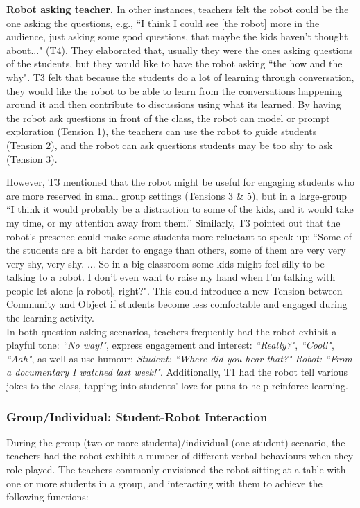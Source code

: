 \textbf{Robot asking teacher.} In other instances, teachers felt the robot could be the one asking the questions, e.g., ``I think I could see [the robot] more in the audience, just asking some good questions, that maybe the kids haven’t thought about..." (T4). They elaborated that, usually they were the ones asking questions of the students, but they would like to have the robot asking ``the how and the why". T3 felt that because the students do a lot of learning through conversation, they would like the robot to be able to learn from the conversations happening around it and then contribute to discussions using what its learned. By having the robot ask questions in front of the class, the robot can model or prompt exploration (Tension 1), the teachers can use the robot to guide students (Tension 2), and the robot can ask questions students may be too shy to ask (Tension 3).

However, T3 mentioned that the robot might be useful for engaging students who are more reserved in small group settings (Tensions 3 \& 5), but in a large-group ``I think it would probably be a distraction to some of the kids, and it would take my time, or my attention away from them.'' Similarly, T3 pointed out that the robot's presence could make some students more reluctant to speak up: ``Some of the students are a bit harder to engage than others, some of them are very very very shy, very shy. ... So in a big classroom some kids might feel silly to be talking to a robot.  I don't even want to raise my hand when I'm talking with people let alone [a robot], right?". This could introduce a new Tension between Community and Object if students become less comfortable and engaged during the learning activity.\\ 

In both question-asking scenarios, teachers frequently had the robot exhibit a playful tone: \textit{``No way!"}, express engagement and interest: \textit{``Really?"}, \textit{``Cool!"}, \textit{``Aah"}, as well as use humour:\textit{ Student: ``Where did you hear that?" Robot: ``From a documentary I watched last week!"}. Additionally, T1 had the robot tell various jokes to the class, tapping into students' love for puns to help reinforce learning.




\subsubsection{Group/Individual: Student-Robot Interaction}
\label{sec:18}
During the group (two or more students)/individual (one student) scenario, the teachers had the robot exhibit a number of different verbal behaviours when they role-played. The teachers commonly envisioned the robot sitting at a table with one or more students in a group, and interacting with them to achieve the following functions:\\


